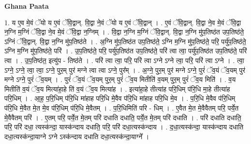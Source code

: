\documentclass[17pt]{extarticle}
\begin{document}
\textbf{Ghana Paata } \newline

1. य ए॒व मे॒वं ॅयो य ए॒वं ॅवि॒द्वान्. वि॒द्वा ने॒वं ॅयो य ए॒वं ॅवि॒द्वान् । . ए॒वं ॅवि॒द्वान्. वि॒द्वा ने॒व मे॒वं ॅवि॒द्वा न॒ग्नि म॒ग्निं ॅवि॒द्वा ने॒व मे॒वं ॅवि॒द्वा न॒ग्निम् । . वि॒द्वा न॒ग्नि म॒ग्निं ॅवि॒द्वान्. वि॒द्वा न॒ग्नि मु॑प॒तिष्ठ॑त उप॒तिष्ठ॑ते॒ ऽग्निं ॅवि॒द्वान्. वि॒द्वा न॒ग्नि मु॑प॒तिष्ठ॑ते । . अ॒ग्नि मु॑प॒तिष्ठ॑त उप॒तिष्ठ॑ते॒ ऽग्नि म॒ग्नि मु॑प॒तिष्ठ॑ते॒ परि॒ पर्यु॑प॒तिष्ठ॑ते॒ ऽग्नि म॒ग्नि मु॑प॒तिष्ठ॑ते॒ परि॑ । . उ॒प॒तिष्ठ॑ते॒ परि॒ पर्यु॑प॒तिष्ठ॑त उप॒तिष्ठ॑ते॒ परि॑ त्वा त्वा॒ पर्यु॑प॒तिष्ठ॑त उप॒तिष्ठ॑ते॒ परि॑ त्वा । . उ॒प॒तिष्ठ॑त॒ इत्यु॑प - तिष्ठ॑ते । . परि॑ त्वा त्वा॒ परि॒ परि॑ त्वा ऽग्ने ऽग्ने त्वा॒ परि॒ परि॑ त्वा ऽग्ने । . त्वा॒ ऽग्ने॒ ऽग्ने॒ त्वा॒ त्वा॒ ऽग्ने॒ पुर॒म् पुर॑ मग्ने त्वा त्वा ऽग्ने॒ पुर᳚म् । . अ॒ग्ने॒ पुर॒म् पुर॑ मग्ने ऽग्ने॒ पुरं॑ ॅव॒यं ॅव॒यम् पुर॑ मग्ने ऽग्ने॒ पुरं॑ ॅव॒यम् । . पुरं॑ ॅव॒यं ॅव॒यम् पुर॒म् पुरं॑ ॅव॒य मितीति॑ व॒यम् पुर॒म् पुरं॑ ॅव॒य मिति॑ । . व॒य मितीति॑ व॒यं ॅव॒य मित्या॑हा॒हे ति॑ व॒यं ॅव॒य मित्या॑ह । . इत्या॑हा॒हे तीत्या॑ह परि॒धिम् प॑रि॒धि मा॒हे तीत्या॑ह परि॒धिम् । . आ॒ह॒ प॒रि॒धिम् प॑रि॒धि मा॑हाह परि॒धि मे॒वैव प॑रि॒धि मा॑हाह परि॒धि मे॒व । . प॒रि॒धि मे॒वैव प॑रि॒धिम् प॑रि॒धि मे॒वैत मे॒त मे॒व प॑रि॒धिम् प॑रि॒धि मे॒वैतम् । . प॒रि॒धिमिति॑ परि - धिम् । . ए॒वैत मे॒त मे॒वैवैतम् परि॒ पर्ये॒त मे॒वैवैतम् परि॑ । . ए॒तम् परि॒ पर्ये॒त मे॒तम् परि॑ दधाति दधाति॒ पर्ये॒त मे॒तम् परि॑ दधाति । . परि॑ दधाति दधाति॒ परि॒ परि॑ दधा॒ त्यस्क॑न्दा॒ यास्क॑न्दाय दधाति॒ परि॒ परि॑ दधा॒त्यस्क॑न्दाय । . द॒धा॒त्यस्क॑न्दा॒ यास्क॑न्दाय दधाति दधा॒त्यस्क॑न्दा॒याग्ने ऽग्ने ऽस्क॑न्दाय दधाति दधा॒त्यस्क॑न्दा॒याग्ने᳚ । \newline
\end{document}
